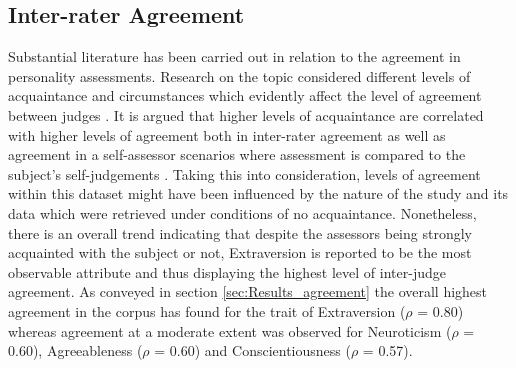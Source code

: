 \documentclass{l4proj}
\begin{document}
\subsection{Inter-rater Agreement}
Substantial literature has been carried out in relation to the agreement in personality assessments. Research on the topic considered different levels of acquaintance and circumstances which evidently affect the level of agreement between judges \citep{john1993determinants}. It is argued that higher levels of acquaintance are correlated with higher levels of agreement both in inter-rater agreement as well as agreement in a self-assessor scenarios where assessment is compared to the subject’s self-judgements \citep{paunonen1989consensus,funder1988friends}. 
Taking this into consideration, levels of agreement within this dataset might have been influenced by the nature of the study and its data which were retrieved under conditions of no acquaintance. 
Nonetheless, there is an overall trend indicating that despite the assessors being strongly acquainted with the subject or not, Extraversion is reported to be the most observable attribute and thus displaying the highest level of inter-judge agreement. 
As conveyed in section \ref{sec:Results_agreement} the overall highest agreement in the corpus has found for the trait of Extraversion ($\rho$ = 0.80) whereas agreement at a moderate extent was observed for Neuroticism ($\rho$ = 0.60), Agreeableness ($\rho$ = 0.60) and Conscientiousness ($\rho$ = 0.57).
\end{document}
